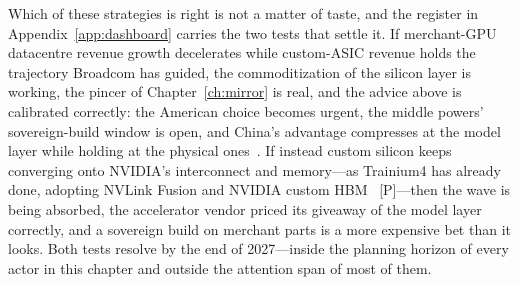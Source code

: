 Which of these strategies is right is not a matter of taste, and the register in Appendix~\ref{app:dashboard} carries the two tests that settle it. If merchant-GPU datacentre revenue growth decelerates while custom-ASIC revenue holds the trajectory Broadcom has guided, the commoditization of the silicon layer is working, the pincer of Chapter~\ref{ch:mirror} is real, and the advice above is calibrated correctly: the American choice becomes urgent, the middle powers' sovereign-build window is open, and China's advantage compresses at the model layer while holding at the physical ones~\cite{broadcom-q2fy26}. If instead custom silicon keeps converging onto NVIDIA's interconnect and memory---as Trainium4 has already done, adopting NVLink Fusion and NVIDIA custom HBM~\cite{aws-nvda} [P]---then the wave is being absorbed, the accelerator vendor priced its giveaway of the model layer correctly, and a sovereign build on merchant parts is a more expensive bet than it looks. Both tests resolve by the end of 2027---inside the planning horizon of every actor in this chapter and outside the attention span of most of them.
